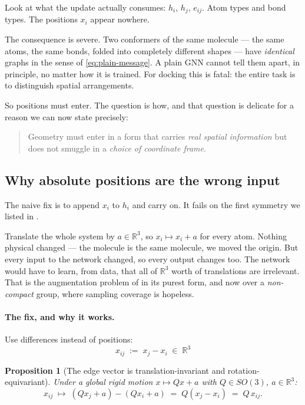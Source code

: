 \documentclass[11pt,a4paper]{report}
\newtheorem{proposition}[proposition]{Proposition}
\theoremstyle{definition}
\theoremstyle{remark}
\newcommand{\RR}{\mathbb R}
\begin{document}
Look at what the update actually consumes: $h_i$, $h_j$, $e_{ij}$. Atom
types and bond types. The positions $x_i$ appear nowhere.

The consequence is severe. Two conformers of the same molecule --- the same
atoms, the same bonds, folded into completely different shapes --- have
\emph{identical} graphs in the sense of \eqref{eq:plain-message}. A plain
GNN cannot tell them apart, in principle, no matter how it is trained. For
docking this is fatal: the entire task is to distinguish spatial
arrangements.

So positions must enter. The question is how, and that question is delicate
for a reason we can now state precisely:

\begin{quote}
Geometry must enter in a form that carries \emph{real spatial information}
but does not smuggle in a \emph{choice of coordinate frame}.
\end{quote}

\subsection{Why absolute positions are the wrong input}
\label{sec:no-absolute-positions}

The naive fix is to append $x_i$ to $h_i$ and carry on. It fails on the
first symmetry we listed in .

Translate the whole system by $a\in\RR^3$, so $x_i\mapsto x_i+a$ for every
atom. Nothing physical changed --- the molecule is the same molecule, we
moved the origin. But every input to the network changed, so every output
changes too. The network would have to learn, from data, that all of $\RR^3$
worth of translations are irrelevant. That is the augmentation problem of
 in its purest form, and now over a
\emph{non-compact} group, where sampling coverage is hopeless.

\paragraph{The fix, and why it works.} Use differences instead of positions:
\begin{equation}
\label{eq:edge-vector-def}
\boxed{\;x_{ij} \;:=\; x_j - x_i \;\in\;\RR^3\;}
\end{equation}

\begin{proposition}[The edge vector is translation-invariant and rotation-equivariant]
\label{prop:edge-vector-symmetry}
Under a global rigid motion $x\mapsto Qx+a$ with $Q\in SO(3)$, $a\in\RR^3$:
\[
x_{ij} \;\longmapsto\; (Qx_j+a)-(Qx_i+a) \;=\; Q(x_j-x_i) \;=\; Q\,x_{ij} .
\]
\end{proposition}
\end{document}

